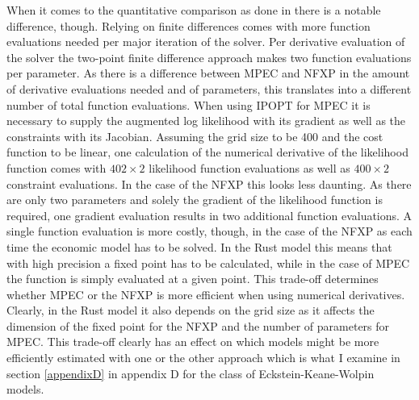 When it comes to the quantitative comparison as done in \cite{Iskhakov.2016} there is a notable difference, though. Relying on finite differences comes with more function evaluations needed per major iteration of the solver. Per derivative evaluation of the solver the two-point finite difference approach makes two function evaluations per parameter. As there is a difference between MPEC and NFXP in the amount of derivative evaluations needed and of parameters, this translates into a different number of total function evaluations. When using IPOPT for MPEC it is necessary to supply the augmented log likelihood with its gradient as well as the constraints with its Jacobian. Assuming the grid size to be 400 and the cost function to be linear, one calculation of the numerical derivative of the likelihood function comes with $402 \times 2$ likelihood function evaluations as well as $400 \times 2$ constraint evaluations. In the case of the NFXP this looks less daunting. As there are only two parameters and solely the gradient of the likelihood function is required, one gradient evaluation results in two additional function evaluations. A single function evaluation is more costly, though, in the case of the NFXP as each time the economic model has to be solved. In the Rust model this means that with high precision a fixed point has to be calculated, while in the case of MPEC the function is simply evaluated at a given point. This trade-off determines whether MPEC or the NFXP is more efficient when using numerical derivatives. Clearly, in the Rust model it also depends on the grid size as it affects the dimension of the fixed point for the NFXP and the number of parameters for MPEC. This trade-off clearly has an effect on which models might be more efficiently estimated with one or the other approach which is what I examine in section \ref{appendixD} in appendix D for the class of Eckstein-Keane-Wolpin models.

